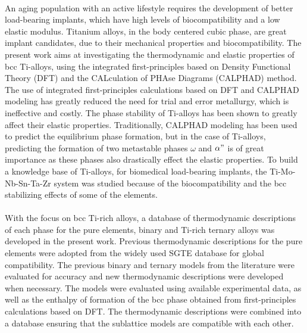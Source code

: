 \paragraph*{} An aging population with an active lifestyle requires the development of better load-bearing implants, which have high levels of biocompatibility and a low elastic modulus. Titanium alloys, in the body centered cubic phase, are great implant candidates, due to their mechanical properties and biocompatibility. The present work aims at investigating the thermodynamic and elastic properties of bcc Ti-alloys, using the integrated first-principles based on Density Functional Theory (DFT) and the CALculation of PHAse Diagrams (CALPHAD) method. The use of integrated first-principles calculations based on DFT and CALPHAD modeling has greatly reduced the need for trial and error metallurgy, which is ineffective and costly. The phase stability of Ti-alloys has been shown to greatly affect their elastic properties. Traditionally, CALPHAD modeling has been used to predict the equilibrium phase formation, but in the case of Ti-alloys, predicting the formation of two metastable phases $\omega$ and $\alpha"$ is of great importance as these phases also drastically effect the elastic properties. To build a knowledge base of Ti-alloys, for biomedical load-bearing implants, the Ti-Mo-Nb-Sn-Ta-Zr system was studied because of the biocompatibility and the bcc stabilizing effects of some of the elements.
\paragraph*{} With the focus on bcc Ti-rich alloys, a database of thermodynamic descriptions of each phase for the pure elements, binary and Ti-rich ternary alloys was developed in the present work. Previous thermodynamic descriptions for the pure elements were adopted from the widely used SGTE database for global compatibility. The previous binary and ternary models from the literature were evaluated for accuracy and new thermodynamic descriptions were developed when necessary. The models were evaluated using available experimental data, as well as the enthalpy of formation of the bcc phase obtained from first-principles calculations based on DFT. The thermodynamic descriptions were combined into a database ensuring that the sublattice models are compatible with each other.
